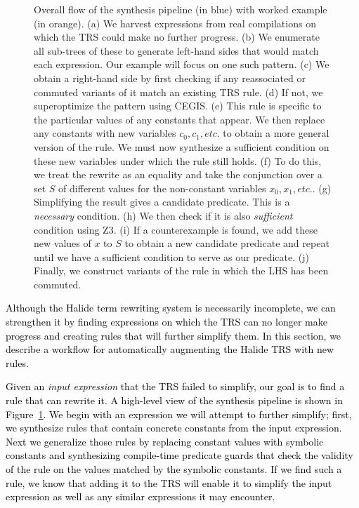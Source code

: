\documentclass[acmsmall,review]{acmart}\settopmatter{printfolios=true,printccs=false,printacmref=false}
\newcommand{\modified}[1]{\textcolor{black}{{#1}}}
\begin{document}
\begin{figure}
  \caption{Overall flow of the synthesis pipeline (in blue) with worked example (in orange). (a) We harvest expressions from real compilations on which the TRS could make no further progress. (b) We enumerate all sub-trees of these to generate left-hand sides that would match each expression. Our example will focus on one such pattern. (c) We obtain a right-hand side by first checking if any reassociated or commuted variants of it match an existing TRS rule. (d) If not, we superoptimize the pattern using CEGIS. (e) This rule is specific to the particular values of any constants that appear. We then replace any constants with new variables $c_0, c_1, etc.$ to obtain a more general version of the rule. We must now synthesize a sufficient condition on these new variables under which the rule still holds. (f) To do this, we treat the rewrite as an equality and take the conjunction over a set $S$ of different values for the non-constant variables $x_0, x_1, etc.$. (g) Simplifying the result gives a candidate predicate. This is a \emph{necessary} condition. (h) We then check if it is also \emph{sufficient} condition using Z3. (i) If a counterexample is found, we add these new values of $x$ to $S$ to obtain a new candidate predicate and repeat until we have a sufficient condition to serve as our predicate. (j) Finally, we construct variants of the rule in which the LHS has been commuted.}
\label{fig:synthesis-flow}
\end{figure}


\modified{Although the Halide term rewriting system is necessarily incomplete, we can strengthen 
it by finding expressions on which the TRS can no longer make progress and creating 
rules that will further simplify them.
In this section, we describe a workflow for automatically augmenting the Halide TRS with new rules.}

\modified{Given an \emph{input expression} that the TRS failed to simplify, our goal is to find a rule that
can rewrite it. A high-level view of the synthesis pipeline is shown in Figure~\ref{fig:synthesis-flow}.
We begin with an expression we will attempt to further simplify; 
first, we synthesize rules that contain concrete constants from the input expression. 
Next we generalize those rules by replacing constant values with symbolic constants and synthesizing compile-time 
predicate guards 
that check the validity of the rule on the values matched by the symbolic constants. If we 
find such a rule, we know that adding it to the TRS will enable it to simplify the input
expression as well as any similar expressions it may encounter.}
\end{document}

